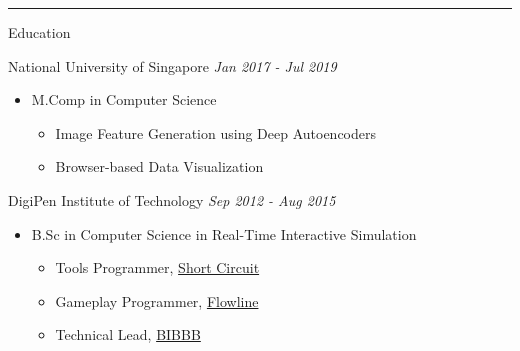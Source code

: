 \documentclass[letterpaper,11pt]{article}
\newcommand{\cvtitle}[1]{\huge\raggedright \textcolor{section_color}{#1}\\}
\newcommand{\cvhead}[1]{\large\raggedright \textcolor{subsection_color}{#1}\\}
\newcommand{\cvlist}[1]{\vspace{-12pt}\small \textcolor{item_color}{\begin{itemize}#1\end{itemize}}}
\newcommand{\cvli}[1]{\vspace{-4pt} \item{#1}}
\newcommand{\cvline}[0]{\noindent\rule{19cm}{0.4pt}}
\newcommand{\link}[2]{\textcolor{link_color}{\href{#1}{#2}}}
\newcommand{\qualifier}[1]{\hfill \textsl{\footnotesize #1}}
\begin{document}
\cvline

\cvtitle{Education}
    \cvhead{National University of Singapore \qualifier{Jan 2017 - Jul 2019}}
    \cvlist{
        \cvli{
            \cvhead{M.Comp in Computer Science}
            \cvlist{
                \cvli{Image Feature Generation using Deep Autoencoders}
                \cvli{Browser-based Data Visualization}
            }
        }
    }

    \cvhead{DigiPen Institute of Technology \qualifier{Sep 2012 - Aug 2015}}
    \cvlist{
        \cvli{
            \cvhead{B.Sc in Computer Science in Real-Time Interactive Simulation}
            \cvlist{
                \cvli{Tools Programmer, \link{http://games.digipen.edu/games/shortcircuit}{Short Circuit}}
                \cvli{Gameplay Programmer, \link{http://games.digipen.edu/games/flowline}{Flowline}}
                \cvli{Technical Lead, \link{http://games.digipen.edu/games/bibbb}{BIBBB}}
            }
        }
    }
\end{document}

